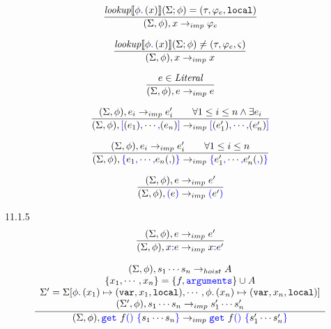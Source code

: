\documentclass[a4paper]{article}
\newcommand{\code}[1]{\textcolor{blue}{\tt #1}}
\newcommand{\mydot}{.\,}
\newcommand{\var}{{\tt{var}}}
\newcommand{\local}{{\tt{local}}}
\newcommand{\lookup}{\emph{lookup}}
\begin{document}
\begin{equation*}
\frac{
    \lookup \llbracket \phi \code{\mydot} (x) \rrbracket (\Sigma; \phi) = (\tau, \varphi_e, \local)
}{
    (\Sigma, \phi), x \rightarrow_{imp} \varphi_e
}
\end{equation*}

\begin{equation*}
\frac{
    \lookup \llbracket \phi \code{\mydot} (x) \rrbracket (\Sigma; \phi) \ne (\tau, \varphi_e, \varsigma)
}{
    (\Sigma, \phi), x \rightarrow_{imp} x
}
\end{equation*}

\begin{equation*}
\frac{
    e \in \emph{Literal}
}{
    (\Sigma, \phi), e \rightarrow_{imp} e
}
\end{equation*}

\begin{equation*}
\frac{
    (\Sigma, \phi), e_i \rightarrow_{imp} e'_i \qquad \forall 1 \le i \le n \wedge \exists e_i
}{
    (\Sigma, \phi), \code{[} (e_1) \code{,} \cdots \code{,} (e_n) \code{]} \rightarrow_{imp} \code{[} (e'_1) \code{,} \cdots \code{,} (e'_n) \code{]}
}
\end{equation*}

\begin{equation*}
\frac{
    (\Sigma, \phi), e_i \rightarrow_{imp} e'_i \qquad \forall 1 \le i \le n
}{
    (\Sigma, \phi), \code{\{} e_1 \code{,} \cdots \code{,} e_n (\code{,}) \code{\}} \rightarrow_{imp} \code{\{} e'_1 \code{,} \cdots \code{,} e'_n (\code{,}) \code{\}}
}
\end{equation*}

\begin{equation*}
\frac{
    (\Sigma, \phi), e \rightarrow_{imp} e'
}{
    (\Sigma, \phi), \code{(} e \code{)} \rightarrow_{imp} \code{(} e' \code{)}
}
\end{equation*}

11.1.5
\begin{equation*}
\frac{
    (\Sigma, \phi), e \rightarrow_{imp} e'
}{
    (\Sigma, \phi), x \code{:} e \rightarrow_{imp} x \code{:} e'
}
\end{equation*}

\begin{equation*}
\frac{
    \begin{array}{c}
    (\Sigma, \phi), s_1 \cdots s_n \rightarrow_{hoist} A \\
    \{ x_1, \cdots, x_n \} = \{ f, \code{arguments} \} \cup A \\
    \Sigma' = \Sigma [ \phi \code{\mydot} (x_1) \mapsto (\var, x_1, \local), \cdots, \phi \code{\mydot} (x_n) \mapsto (\var, x_n, \local) ] \\
    (\Sigma', \phi), s_1 \cdots s_n \rightarrow_{imp} s'_1 \cdots s'_n \\
    \end{array}
}{
    (\Sigma, \phi), \code{get}\ f \code{()}\ \code{\{} s_1 \cdots s_n \code{\}} \rightarrow_{imp} \code{get}\ f \code{()}\ \code{\{} s'_1 \cdots s'_n \code{\}}
}
\end{equation*}
\end{document}

